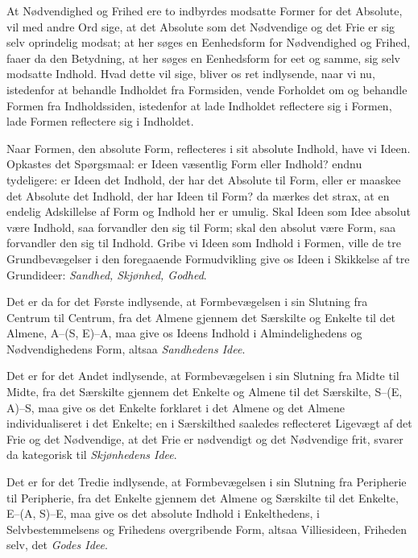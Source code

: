 \documentclass[12pt]{book}
\newcommand{\opage}[1]{\marginnote{\footnotesize\textit{[#1]}}}
\begin{document}
At Nødvendighed og Frihed ere to indbyrdes modsatte Former for det Absolute, vil med andre Ord sige, at det Absolute som det Nødvendige og det Frie er sig selv oprindelig modsat; at her søges en Eenhedsform for Nødvendighed og Frihed, faaer da den Betydning, at her søges en Eenhedsform for eet og samme, sig selv modsatte Indhold. Hvad dette vil sige, bliver os ret indlysende, naar vi nu, istedenfor at behandle Indholdet fra Formsiden, vende Forholdet om og behandle Formen fra Indholdssiden, istedenfor at lade Indholdet reflectere sig i Formen, lade Formen reflectere sig i Indholdet.

Naar Formen, den absolute Form, reflecteres i sit absolute Indhold, have vi Ideen. Opkastes det Spørgsmaal: er Ideen væsentlig Form eller Indhold? endnu tydeligere: er Ideen det Indhold, der har det Absolute til Form, eller er maaskee det Absolute det Indhold, der har Ideen til Form? da mærkes det strax, at en endelig Adskillelse af Form og Indhold her er umulig. Skal Ideen som Idee absolut være Indhold, saa forvandler den sig til Form; skal den absolut være Form, saa forvandler den sig til Indhold. Gribe vi Ideen som Indhold i Formen, ville de tre Grundbevægelser
\opage{369}i den foregaaende Formudvikling give os Ideen i Skikkelse af tre Grundideer: \emph{Sandhed, Skjønhed, Godhed}.

Det er da for det Første indlysende, at Formbevægelsen i sin Slutning fra Centrum til Centrum, fra det Almene gjennem det Særskilte og Enkelte til det Almene, A--(S, E)--A, maa give os Ideens Indhold i Almindelighedens og Nødvendighedens Form, altsaa \emph{Sandhedens Idee}.

Det er for det Andet indlysende, at Formbevægelsen i sin Slutning fra Midte til Midte, fra det Særskilte gjennem det Enkelte og Almene til det Særskilte, S--(E, A)--S, maa give os det Enkelte forklaret i det Almene og det Almene individualiseret i det Enkelte; en i Særskilthed saaledes reflecteret Ligevægt af det Frie og det Nødvendige, at det Frie er nødvendigt og det Nødvendige frit, svarer da kategorisk til \emph{Skjønhedens Idee}.

Det er for det Tredie indlysende, at Formbevægelsen i sin Slutning fra Peripherie til Peripherie, fra det Enkelte gjennem det Almene og Særskilte til det Enkelte, E--(A, S)--E, maa give os det absolute Indhold i Enkelthedens, i Selvbestemmelsens og Frihedens overgribende Form, altsaa Villiesideen, Friheden selv, det \emph{Godes Idee}.
\end{document}
